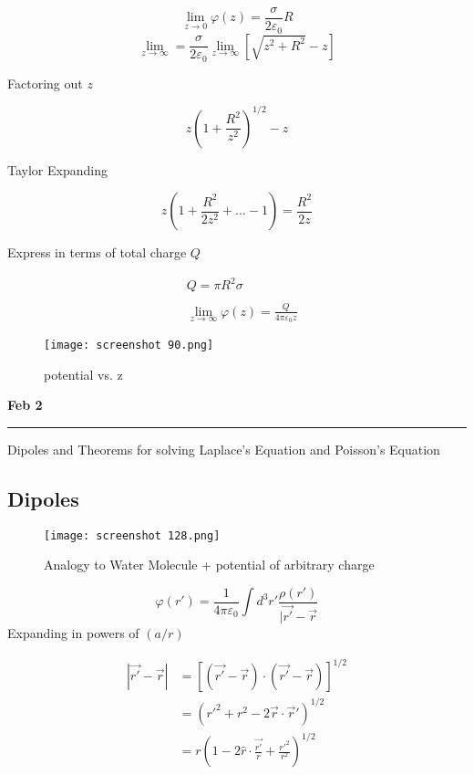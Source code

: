 \documentclass[svgnames]{article}   	%
\begin{document}
\vspace{5px} \[
  \lim_{z\to 0} \varphi(z) = \frac{\sigma}{2\varepsilon_0}R
\] \vspace{5px}
\[
  \lim_{z \to \infty} = \frac{\sigma}{2\varepsilon_0} \lim_{z \to \infty}
  [ \sqrt{z^2 + R^2} - z] 
\]

Factoring out $z$ 

\vspace{5px} \[
  z \left(1 + \frac{R^2}{z^2} \right)^{1/2} - z
\] \vspace{5px}

Taylor Expanding 

\vspace{5px} \[
z(1 + \frac{R^2}{2z^2} + \dots - 1 ) = \frac{R^2}{2z}
\] \vspace{5px}

Express in terms of total charge $Q$ 

\begin{align*}
  &Q = \pi R^2 \sigma \\\\
  &\lim_{z \to \infty} \varphi(z) = \frac{Q}{4\pi \varepsilon_0 z} 
\end{align*}



\begin{figure}[H]
  \centering
    \texttt{[image: screenshot 90.png]}
    \caption{potential vs. z}
\end{figure}

\newpage
\noindent \textbf{Feb 2} \hrule
\vspace{10px}
Dipoles and Theorems for solving Laplace's Equation and Poisson's Equation

\subsection{Dipoles}


\begin{figure}[H]
  \centering
    \texttt{[image: screenshot 128.png]}
    \caption{Analogy to Water Molecule + potential of arbitrary charge}
\end{figure}




\[
  \varphi(r') = \frac{1}{4\pi \varepsilon_0}\int d^3 r'
  \frac{\rho(r')}{|\vec{r'} - \vec{r}}
\]
Expanding in powers of $(a/r)$

\begin{align*}
  |\vec{r'} - \vec{r}| &= [(\vec{r'} - \vec{r}) \cdot (\vec{r'}
  - \vec{r})]^{1/2} \\    
                       &= (r'^2 + r^2 - 2\vec{r} \cdot \vec{r}')^{1/2} \\
                       &= r\left(1 - 2 \hat{r} \cdot \frac{\vec{r'}}{r}
                       + \frac{r'^2}{r^2}\right)^{1/2}
\end{align*}
\end{document}

